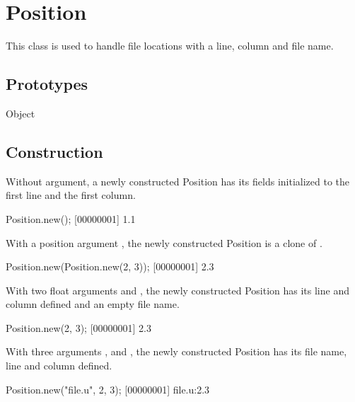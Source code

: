 
\section{Position}

This class is used to handle file locations with a line, column and file
name.

\subsection{Prototypes}
\begin{refObjects}
\item[Object]
\end{refObjects}

\subsection{Construction}

Without argument, a newly constructed Position has its fields initialized to
the first line and the first column.

\begin{urbiscript}[firstnumber=1]
Position.new();
[00000001] 1.1
\end{urbiscript}

With a position argument , the newly constructed Position is a clone
of .

\begin{urbiscript}
Position.new(Position.new(2, 3));
[00000001] 2.3
\end{urbiscript}

With two float arguments  and , the newly constructed
Position has its line and column defined and an empty file name.

\begin{urbiscript}
Position.new(2, 3);
[00000001] 2.3
\end{urbiscript}

With three arguments ,  and , the newly
constructed Position has its file name, line and column defined.

\begin{urbiscript}
Position.new("file.u", 2, 3);
[00000001] file.u:2.3
\end{urbiscript}

